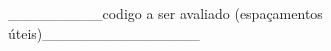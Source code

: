 _________codigo a ser avaliado (espaçamentos úteis)_______________


\renewcommand{\cftpartpresnum}{}          %
\renewcommand{\cftpartfont}{\large\bfseries} %
\renewcommand{\cftpartpagefont}{\bfseries}   %
\renewcommand{\cftpartleader}{\cftdotfill{\cftdotsep}} %
\renewcommand{\cftpartafterpnum}{\par\addvspace{10pt}} %

\makeatletter
\renewcommand{\@cftmakepartnum}[1]{}
\makeatother









